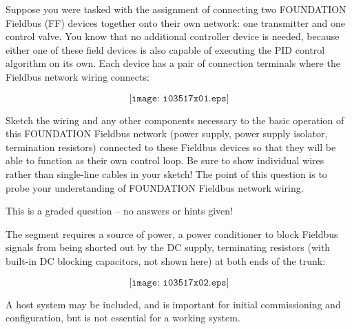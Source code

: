 

Suppose you were tasked with the assignment of connecting two FOUNDATION Fieldbus (FF) devices together onto their own network: one transmitter and one control valve.  You know that no additional controller device is needed, because either one of these field devices is also capable of executing the PID control algorithm on its own.  Each device has a pair of connection terminals where the Fieldbus network wiring connects:

\vskip 80pt

$$\texttt{[image: i03517x01.eps]}$$

Sketch the wiring and any other components necessary to the basic operation of this FOUNDATION Fieldbus network (power supply, power supply isolator, termination resistors) connected to these Fieldbus devices so that they will be able to function as their own control loop.  Be sure to show individual wires rather than single-line cables in your sketch!  The point of this question is to probe your understanding of FOUNDATION Fieldbus network wiring.

\vfil 

\eject






This is a graded question -- no answers or hints given!
 






The segment requires a source of power, a power conditioner to block Fieldbus signals from being shorted out by the DC supply, terminating resistors (with built-in DC blocking capacitors, not shown here) at both ends of the trunk:

$$\texttt{[image: i03517x02.eps]}$$

A host system may be included, and is important for initial commissioning and configuration, but is not essential for a working system.




